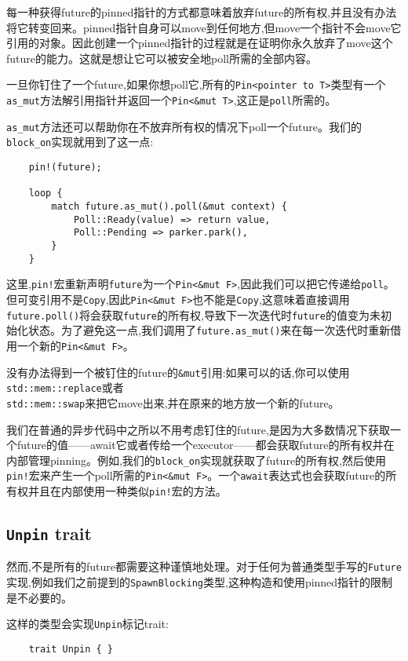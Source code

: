 每一种获得future的pinned指针的方式都意味着放弃future的所有权,并且没有办法将它转变回来。pinned指针自身可以move到任何地方,但move一个指针不会move它引用的对象。因此创建一个pinned指针的过程就是在证明你永久放弃了move这个future的能力。这就是想让它可以被安全地poll所需的全部内容。

一旦你钉住了一个future,如果你想poll它,所有的\texttt{Pin<pointer to T>}类型有一个\texttt{as\_mut}方法解引用指针并返回一个\texttt{Pin<\&mut T>},这正是\texttt{poll}所需的。

\texttt{as\_mut}方法还可以帮助你在不放弃所有权的情况下poll一个future。我们的\texttt{block\_on}实现就用到了这一点:
\begin{verbatim}
    pin!(future);

    loop {
        match future.as_mut().poll(&mut context) {
            Poll::Ready(value) => return value,
            Poll::Pending => parker.park(),
        }
    }
\end{verbatim}

这里,\texttt{pin!}宏重新声明\texttt{future}为一个\texttt{Pin<\&mut F>},因此我们可以把它传递给\texttt{poll}。但可变引用不是\texttt{Copy},因此\texttt{Pin<\&mut F>}也不能是\texttt{Copy},这意味着直接调用\texttt{future.poll()}将会获取\texttt{future}的所有权,导致下一次迭代时\texttt{future}的值变为未初始化状态。为了避免这一点,我们调用了\texttt{future.as\_mut()}来在每一次迭代时重新借用一个新的\texttt{Pin<\&mut F>}。

没有办法得到一个被钉住的future的\texttt{\&mut}引用:如果可以的话,你可以使用\texttt{std::mem::replace}或者\\
\texttt{std::mem::swap}来把它move出来,并在原来的地方放一个新的future。

我们在普通的异步代码中之所以不用考虑钉住的future,是因为大多数情况下获取一个future的值——await它或者传给一个executor——都会获取future的所有权并在内部管理pinning。例如,我们的\texttt{block\_on}实现就获取了future的所有权,然后使用\texttt{pin!}宏来产生一个poll所需的\texttt{Pin<\&mut F>}。一个\texttt{await}表达式也会获取future的所有权并且在内部使用一种类似\texttt{pin!}宏的方法。

\subsection{\texttt{Unpin} trait}
然而,不是所有的future都需要这种谨慎地处理。对于任何为普通类型手写的\texttt{Future}实现,例如我们之前提到的\texttt{SpawnBlocking}类型,这种构造和使用pinned指针的限制是不必要的。

这样的类型会实现\texttt{Unpin}标记trait:
\begin{verbatim}
    trait Unpin { }
\end{verbatim}

